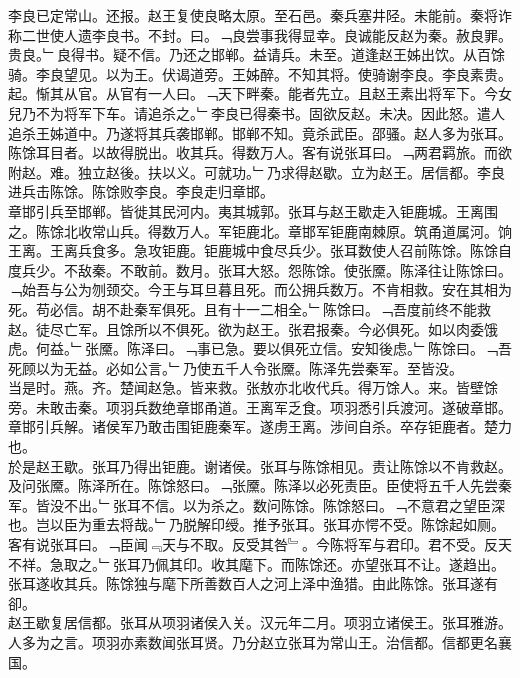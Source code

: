\documentclass{zhvt-classic}
\begin{document}
\hspace*{2em}李良已定常山。还报。赵王复使良略太原。至石邑。秦兵塞井陉。未能前。秦将诈称二世使人遗李良书。不封。曰。﹁良尝事我得显幸。良诚能反赵为秦。赦良罪。贵良。﹂良得书。疑不信。乃还之邯郸。益请兵。未至。道逢赵王姊出饮。从百馀骑。李良望见。以为王。伏谒道旁。王姊醉。不知其将。使骑谢李良。李良素贵。起。惭其从官。从官有一人曰。﹁天下畔秦。能者先立。且赵王素出将军下。今女兒乃不为将军下车。请追杀之。﹂李良已得秦书。固欲反赵。未决。因此怒。遣人追杀王姊道中。乃遂将其兵袭邯郸。邯郸不知。竟杀武臣。邵骚。赵人多为张耳。陈馀耳目者。以故得脱出。收其兵。得数万人。客有说张耳曰。﹁两君羁旅。而欲附赵。难。独立赵後。扶以义。可就功。﹂乃求得赵歇。立为赵王。居信都。李良进兵击陈馀。陈馀败李良。李良走归章邯。\\
\hspace*{2em}章邯引兵至邯郸。皆徙其民河内。夷其城郭。张耳与赵王歇走入钜鹿城。王离围之。陈馀北收常山兵。得数万人。军钜鹿北。章邯军钜鹿南棘原。筑甬道属河。饷王离。王离兵食多。急攻钜鹿。钜鹿城中食尽兵少。张耳数使人召前陈馀。陈馀自度兵少。不敌秦。不敢前。数月。张耳大怒。怨陈馀。使张黡。陈泽往让陈馀曰。﹁始吾与公为刎颈交。今王与耳旦暮且死。而公拥兵数万。不肯相救。安在其相为死。苟必信。胡不赴秦军俱死。且有十一二相全。﹂陈馀曰。﹁吾度前终不能救赵。徒尽亡军。且馀所以不俱死。欲为赵王。张君报秦。今必俱死。如以肉委饿虎。何益。﹂张黡。陈泽曰。﹁事已急。要以俱死立信。安知後虑。﹂陈馀曰。﹁吾死顾以为无益。必如公言。﹂乃使五千人令张黡。陈泽先尝秦军。至皆没。\\
\hspace*{2em}当是时。燕。齐。楚闻赵急。皆来救。张敖亦北收代兵。得万馀人。来。皆壁馀旁。未敢击秦。项羽兵数绝章邯甬道。王离军乏食。项羽悉引兵渡河。遂破章邯。章邯引兵解。诸侯军乃敢击围钜鹿秦军。遂虏王离。涉间自杀。卒存钜鹿者。楚力也。\\
\hspace*{2em}於是赵王歇。张耳乃得出钜鹿。谢诸侯。张耳与陈馀相见。责让陈馀以不肯救赵。及问张黡。陈泽所在。陈馀怒曰。﹁张黡。陈泽以必死责臣。臣使将五千人先尝秦军。皆没不出。﹂张耳不信。以为杀之。数问陈馀。陈馀怒曰。﹁不意君之望臣深也。岂以臣为重去将哉。﹂乃脱解印绶。推予张耳。张耳亦愕不受。陈馀起如厕。客有说张耳曰。﹁臣闻﹃天与不取。反受其咎﹄。今陈将军与君印。君不受。反天不祥。急取之。﹂张耳乃佩其印。收其麾下。而陈馀还。亦望张耳不让。遂趋出。张耳遂收其兵。陈馀独与麾下所善数百人之河上泽中渔猎。由此陈馀。张耳遂有卻。\\
\hspace*{2em}赵王歇复居信都。张耳从项羽诸侯入关。汉元年二月。项羽立诸侯王。张耳雅游。人多为之言。项羽亦素数闻张耳贤。乃分赵立张耳为常山王。治信都。信都更名襄国。\\
\end{document}
